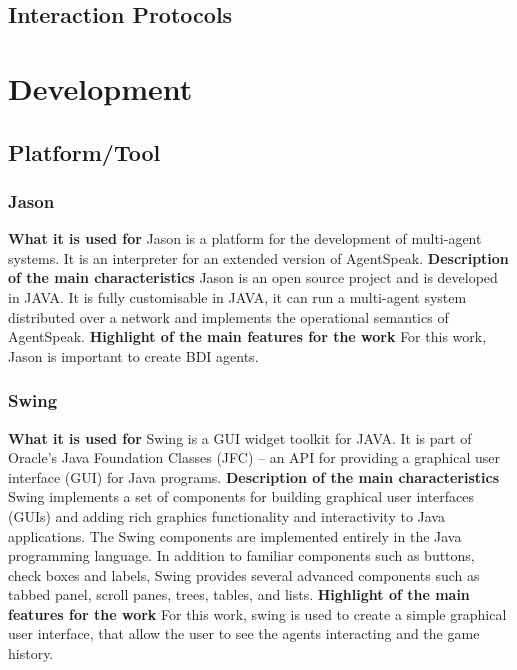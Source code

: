\documentclass{article}
\begin{document}
\subsection{Interaction Protocols}

\section{Development}
\subsection{Platform/Tool}
\subsubsection{Jason}
\textbf{What it is used for}\newline
Jason is a platform for the development of multi-agent systems. It is an interpreter for an extended version of AgentSpeak.
\newline\textbf{Description of the main characteristics}\newline
Jason is an open source project and is developed in JAVA. It is fully customisable in JAVA, it can run a multi-agent system distributed over a network and implements the operational semantics of AgentSpeak.
\newline\textbf{Highlight of the main features for the work}\newline
For this work, Jason is important to create BDI agents. 
\subsubsection{Swing}
\textbf{What it is used for}\newline
Swing is a GUI widget toolkit for JAVA. It is part of Oracle's Java Foundation Classes (JFC) – an API for providing a graphical user interface (GUI) for Java programs.
\newline\textbf{Description of the main characteristics}\newline
Swing implements a set of components for building graphical user interfaces (GUIs) and adding rich graphics functionality and interactivity to Java applications. The Swing components are implemented entirely in the Java programming language. In addition to familiar components such as buttons, check boxes and labels, Swing provides several advanced components such as tabbed panel, scroll panes, trees, tables, and lists.
\newline\textbf{Highlight of the main features for the work}\newline
For this work, swing is used to create a simple graphical user interface, that allow the user to see the agents interacting and the game history.
\end{document}
